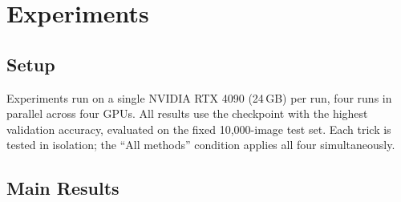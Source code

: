 \section{Experiments}

\label{sec:experiments}

\subsection{Setup}

Experiments run on a single NVIDIA RTX 4090 (24\,GB) per run, four runs in parallel across four GPUs.
All results use the checkpoint with the highest validation accuracy, evaluated on the fixed 10{,}000-image test set.
Each trick is tested in isolation; the ``All methods'' condition applies all four simultaneously.

\subsection{Main Results}

